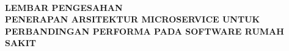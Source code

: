 \renewcommand{\headrulewidth}{3pt} 
\thispagestyle{fancy}

\hspace{-2cm}\\[1cm]
\begin{center}
{\bfseries LEMBAR PENGESAHAN}\\[1.0 cm]
{\bfseries PENERAPAN ARSITEKTUR MICROSERVICE UNTUK PERBANDINGAN PERFORMA PADA SOFTWARE RUMAH SAKIT} \\[0.5 cm]
\end{center}

\vspace{0.5cm}



